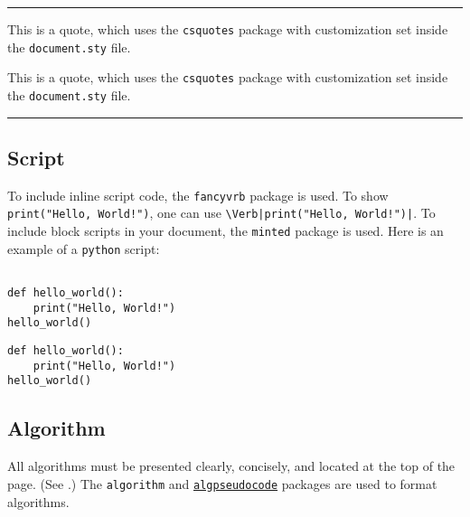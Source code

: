 \noindent\rule{\linewidth}{0.5pt}

\begin{multicols}{2}
  \begin{displayquote}
    This is a quote, which uses the \verb|csquotes| package with customization set inside the \verb|document.sty| file.
  \end{displayquote}
  \columnbreak{}
  \begin{latexcode}
\begin{displayquote}
  This is a quote, which uses the \verb|csquotes| package with customization set inside the \verb|document.sty| file.
\end{displayquote}
  \end{latexcode}
\end{multicols}

\noindent\rule{\linewidth}{0.5pt}

\subsection{Script}

To include inline script code, the \Verb|fancyvrb| package is used.
To show \Verb|print("Hello, World!")|, one can use \Verb+\Verb|print("Hello, World!")|+.
To include block scripts in your document, the \Verb|minted| package is used.
Here is an example of a \Verb|python| script:

\begin{multicols}{2}
  \begin{verbatim}

def hello_world():
    print("Hello, World!")
hello_world()
  \end{verbatim}
  \columnbreak{}
  \begin{latexcode}
\begin{verbatim}
def hello_world():
    print("Hello, World!")
hello_world()
\end{verbatim}
  \end{latexcode}
\end{multicols}


\subsection{Algorithm}

All algorithms must be presented clearly, concisely, and located at the top of the page.
(See .)
The \Verb|algorithm| and \href{https://www.ctan.org/pkg/algpseudocodex/}{\Verb|algpseudocode|} packages are used to format algorithms.

